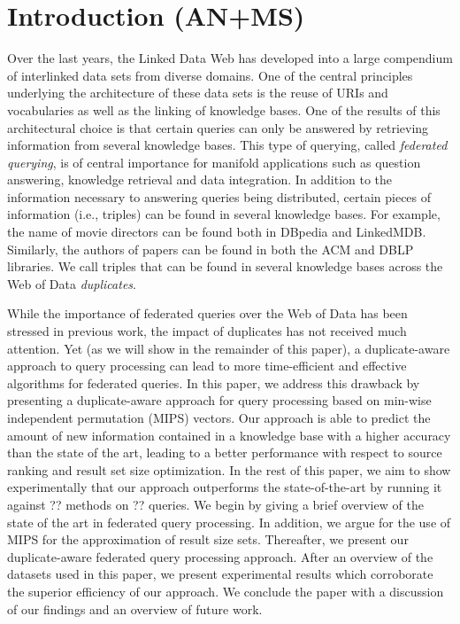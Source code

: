 \documentclass{sig-alternate}  %
\begin{document}
\section{Introduction (AN+MS)}
Over the last years, the Linked Data Web has developed into a large compendium of interlinked data sets from diverse domains. 
One of the central principles underlying the architecture of these data sets is the reuse of URIs and vocabularies as well as the linking of knowledge bases.
One of the results of this architectural choice is that certain queries can only be answered by retrieving information from several knowledge bases.
This type of querying, called \emph{federated querying}, is of central importance for manifold applications such as question answering, knowledge retrieval and data integration.
In addition to the information necessary to answering queries being distributed, certain pieces of information (i.e., triples) can be found in several knowledge bases. 
For example, the name of movie directors can be found both in DBpedia and LinkedMDB.
Similarly, the authors of papers can be found in both the ACM and DBLP libraries.
We call triples that can be found in several knowledge bases across the Web of Data \emph{duplicates}.

While the importance of federated queries over the Web of Data has been stressed in previous work, the impact of duplicates has not received much attention.
Yet (as we will show in the remainder of this paper), a duplicate-aware approach to query processing can lead to more time-efficient and effective algorithms for federated queries.
In this paper, we address this drawback by presenting a duplicate-aware approach for query processing based on min-wise independent permutation (MIPS) vectors.
Our approach is able to predict the amount of new information contained in a knowledge base with a higher accuracy than the state of the art, leading to a better performance with respect to source ranking and result set size optimization. 
In the rest of this paper, we aim to show experimentally that our approach outperforms the state-of-the-art by running it against ?? methods on ?? queries. 
We begin by giving a brief overview of the state of the art in federated query processing.
In addition, we argue for the use of MIPS for the approximation of result size sets.
Thereafter, we present our duplicate-aware federated query processing approach.
After an overview of the datasets used in this paper, we present experimental results which corroborate the superior efficiency of our approach.
We conclude the paper with a discussion of our findings and an overview of future work.
\end{document}
